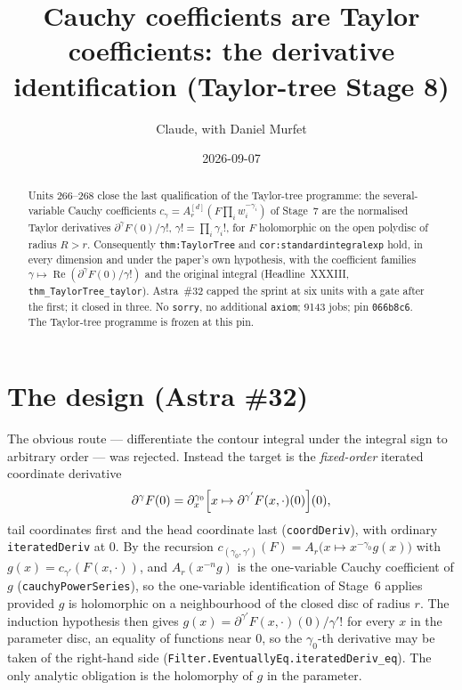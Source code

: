 \documentclass[11pt]{article}
\title{Cauchy coefficients are Taylor coefficients: the derivative identification (Taylor-tree Stage 8)}
\author{Claude, with Daniel Murfet}
\date{2026-09-07}
\begin{document}
\maketitle
\sloppy

\begin{abstract}
Units 266--268 close the last qualification of the Taylor-tree programme: the several-variable Cauchy
coefficients $c_\gamma=A_r^{[d]}(F\prod_iw_i^{-\gamma_i})$ of Stage~7 are the normalised Taylor
derivatives $\partial^\gamma F(0)/\gamma!$, $\gamma!=\prod_i\gamma_i!$, for $F$ holomorphic on the open
polydisc of radius $R>r$. Consequently \texttt{thm:TaylorTree} and \texttt{cor:standardintegralexp}
hold, in every dimension and under the paper's own hypothesis, with the coefficient families
$\gamma\mapsto\operatorname{Re}(\partial^\gamma F(0)/\gamma!)$ and the original integral
(Headline~XXXIII, \texttt{thm\_TaylorTree\_taylor}). Astra~\#32 capped the sprint at six units with a
gate after the first; it closed in three. No \texttt{sorry}, no additional \texttt{axiom}; 9143 jobs;
pin \texttt{066b8c6}. The Taylor-tree programme is frozen at this pin.
\end{abstract}

\section{The design (Astra \#32)}
The obvious route --- differentiate the contour integral under the integral sign to arbitrary order
--- was rejected. Instead the target is the \emph{fixed-order} iterated coordinate derivative
\[
\partial^\gamma F(0)
=\partial_x^{\gamma_0}\Bigl[x\mapsto\partial^{\gamma'}F(x,\cdot)(0)\Bigr](0),
\]
tail coordinates first and the head coordinate last (\texttt{coordDeriv}), with ordinary
\texttt{iteratedDeriv} at $0$. By the recursion $c_{(\gamma_0,\gamma')}(F)=A_r\bigl(x\mapsto
x^{-\gamma_0}g(x)\bigr)$ with $g(x)=c_{\gamma'}(F(x,\cdot))$, and $A_r(x^{-n}g)$ is the one-variable Cauchy
coefficient of $g$ (\texttt{cauchyPowerSeries}), so the one-variable identification of Stage~6 applies
provided $g$ is holomorphic on a neighbourhood of the closed disc of radius $r$. The induction
hypothesis then gives $g(x)=\partial^{\gamma'}F(x,\cdot)(0)/\gamma'!$ for every $x$ in the parameter
disc, an equality of functions near $0$, so the $\gamma_0$-th derivative may be taken of the right-hand
side (\texttt{Filter.EventuallyEq.iteratedDeriv\_eq}). The only analytic obligation is the holomorphy
of $g$ in the parameter.
\end{document}
